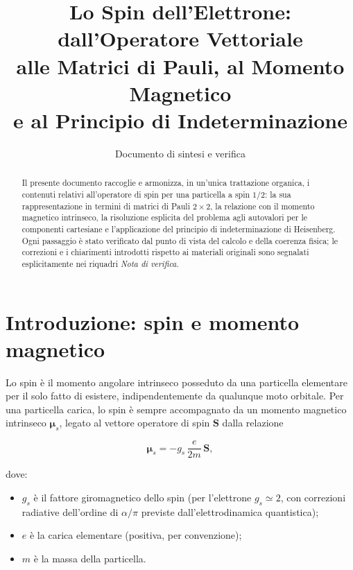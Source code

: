 \documentclass[11pt,a4paper]{article}
\title{\textbf{Lo Spin dell'Elettrone: dall'Operatore Vettoriale \\ alle Matrici di Pauli, al Momento Magnetico \\ e al Principio di Indeterminazione}}
\author{Documento di sintesi e verifica}
\date{}
\begin{document}
\maketitle
\thispagestyle{fancy}

\begin{abstract}
\noindent Il presente documento raccoglie e armonizza, in un'unica trattazione organica, i contenuti relativi all'operatore di spin per una particella a spin $1/2$: la sua rappresentazione in termini di matrici di Pauli $2\times 2$, la relazione con il momento magnetico intrinseco, la risoluzione esplicita del problema agli autovalori per le componenti cartesiane e l'applicazione del principio di indeterminazione di Heisenberg. Ogni passaggio è stato verificato dal punto di vista del calcolo e della coerenza fisica; le correzioni e i chiarimenti introdotti rispetto ai materiali originali sono segnalati esplicitamente nei riquadri \emph{Nota di verifica}.
\end{abstract}

\tableofcontents

\section{Introduzione: spin e momento magnetico}

Lo spin è il momento angolare intrinseco posseduto da una particella elementare per il solo fatto di esistere, indipendentemente da qualunque moto orbitale. Per una particella carica, lo spin è sempre accompagnato da un momento magnetico intrinseco $\boldsymbol{\mu}_s$, legato al vettore operatore di spin $\mathbf{S}$ dalla relazione

\begin{equation}
\boldsymbol{\mu}_s = -g_s\,\frac{e}{2m}\,\mathbf{S},
\label{eq:momento-magnetico}
\end{equation}

dove:
\begin{itemize}[nosep]
  \item $g_s$ è il fattore giromagnetico dello spin (per l'elettrone $g_s \simeq 2$, con correzioni radiative dell'ordine di $\alpha/\pi$ previste dall'elettrodinamica quantistica);
  \item $e$ è la carica elementare (positiva, per convenzione);
  \item $m$ è la massa della particella.
\end{itemize}
\end{document}
